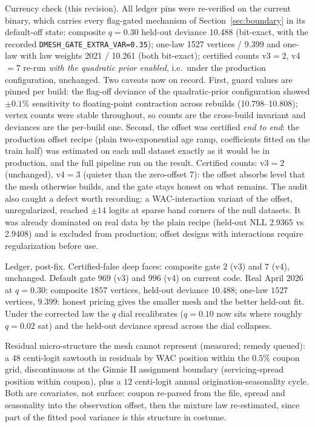 \documentclass[11pt]{article}
\begin{document}
Currency check (this revision). All ledger pins were re-verified on the
current binary, which carries every flag-gated mechanism of
Section~\ref{sec:boundary} in its default-off state: composite
$q{=}0.30$ held-out deviance 10.488 (bit-exact, with the recorded
\texttt{DMESH\_GATE\_EXTRA\_VAR=0.35}); one-law 1527 vertices / 9.399
and one-law with law weights 2021 / 10.261 (both bit-exact); certified
counts v3${}=2$, v4${}=7$ re-run \emph{with the quadratic prior
enabled}, i.e.\ under the production configuration, unchanged. Two
caveats now on record. First, guard values are pinned per build: the
flag-off deviance of the quadratic-prior configuration showed
$\pm 0.1\%$ sensitivity to floating-point contraction across rebuilds
(10.798--10.808); vertex counts were stable throughout, so counts are
the cross-build invariant and deviances are the per-build one. Second,
the offset was certified \emph{end to end}: the production offset
recipe (plain two-exponential age ramp, coefficients fitted on the
train half) was estimated on each null dataset exactly as it would be
in production, and the full pipeline run on the result. Certified
counts: v3${}=2$ (unchanged), v4${}=3$ (quieter than the zero-offset
7): the offset absorbs level that the mesh otherwise builds, and the
gate stays honest on what remains. The audit also caught a defect
worth recording: a WAC-interaction variant of the offset, unregularized,
reached $\pm14$ logits at sparse band corners of the null datasets. It
was already dominated on real data by the plain recipe (held-out NLL
2.9365 vs 2.9408) and is excluded from production; offset designs with
interactions require regularization before use.

Ledger, post-fix. Certified-false deep faces: composite gate $2$ (v3)
and $7$ (v4), unchanged. Default gate $969$ (v3) and $996$ (v4)
on current code. Real April 2026 at $q=0.30$: composite $1857$
vertices, held-out deviance $10.488$; one-law $1527$ vertices,
$9.399$: honest pricing gives the smaller mesh and the better held-out
fit. Under the corrected law the $q$ dial recalibrates
($q=0.10$ now sits where roughly $q=0.02$ sat) and the held-out
deviance spread across the dial collapses.

Residual micro-structure the mesh cannot represent (measured; remedy
queued): a $48$ centi-logit sawtooth in residuals by WAC position
within the $0.5\%$ coupon grid, discontinuous at the Ginnie II
assignment boundary (servicing-spread position within coupon), plus a
$12$ centi-logit annual origination-seasonality cycle. Both are
covariates, not surface: coupon re-parsed from the file, spread and
seasonality into the observation offset, then the mixture law
re-estimated, since part of the fitted pool variance is this structure
in costume.
\end{document}
